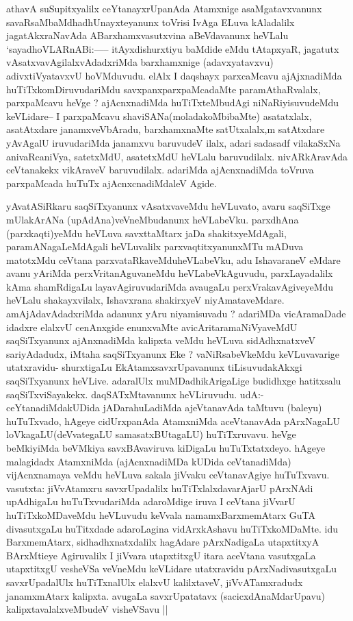 \begin{artha}
athavA suSupitxyalilx ceYtanayxrUpanAda Atamxnige asaMgatavxvanunx
savaRsaMbaMdhadhUnayxteyanunx toVrisi IvAga ELuva kAladalilx
jagatAkxraNavAda ABarxhamxvasutxvina aBeVdavanunx heVLalu
`sayadhoVLARnABi:----- itAyxdishurxtiyu baMdide eMdu tAtapxyaR,
jagatutx vAsatxvavAgilalxvAdadxriMda barxhamxnige (adavxyatavxvu)
adivxtiVyatavxvU hoVMduvudu. elAlx I daqshayx parxcaMcavu ajAjxnadiMda
huTiTxkomDiruvudariMdu savxpanxparxpaMcadaMte paramAthaRvalalx,
parxpaMcavu heVge ? ajAcnxnadiMda huTiTxteMbudAgi niNaRiyisuvudeMdu
keVLidare-- I parxpaMcavu shaviSANa(moladakoMbibaMte) asatatxlalx,
asatAtxdare janamxveVbAradu, barxhamxnaMte satUtxalalx,m satAtxdare
yAvAgalU iruvudariMda janamxvu baruvudeV ilalx, adari sadasadf
vilakaSxNa anivaRcaniVya, satetxMdU, asatetxMdU heVLalu
baruvudilalx. nivARkAravAda ceVtanakekx vikAraveV
baruvudilalx. adariMda ajAcnxnadiMda toVruva parxpaMcada huTuTx
ajAcnxcnadiMdaleV Agide.
\end{artha}

\begin{artha}
yAvatASiRkaru saqSiTxyanunx vAsatxvaveMdu heVLuvato, avaru saqSiTxge
mUlakArANa (upAdAna)veVneMbudanunx heVLabeVku. parxdhAna
(parxkaqti)yeMdu heVLuva savxttaMtarx jaDa shakitxyeMdAgali,
paramANagaLeMdAgali heVLuvalilx parxvaqtitxyanunxMTu mADuva matotxMdu
ceVtana parxvataRkaveMduheVLabeVku, adu IshavaraneV eMdare avanu
yAriMda perxVritanAguvaneMdu heVLabeVkAguvudu, parxLayadalilx kAma
shamRdigaLu layavAgiruvudariMda avaugaLu perxVrakavAgiveyeMdu heVLalu
shakayxvilalx, Ishavxrana shakirxyeV
niyAmataveMdare. amAjAdavAdadxriMda adanunx yAru niyamisuvadu ?
adariMDa vicAramaDade idadxre elalxvU cenAnxgide enunxvaMte
avicAritaramaNiVyaveMdU saqSiTxyanunx ajAnxnadiMda kalipxta veMdu
heVLuva sidAdhxnatxveV sariyAdadudx, iMtaha saqSiTxyanunx Eke ?
vaNiRsabeVkeMdu keVLuvavarige utatxravidu- shurxtigaLu
EkAtamxsavxrUpavanunx tiLisuvudakAkxgi saqSiTxyanunx
heVLive. adaralUlx muMDadhikArigaLige budidhxge hatitxsalu
saqSiTxviSayakekx. daqSATxMtavanunx heVLiruvudu. udA:-
ceYtanadiMdakUDida jADarahuLadiMda ajeVtanavAda taMtuvu (baleyu)
huTuTxvado, hAgeye cidUrxpanAda AtamxniMda aceVtanavAda pArxNagaLU
loVkagaLU(deVvategaLU samasatxBUtagaLU) huTiTxruvavu. heVge beMkiyiMda
beVMkiya savxBAvaviruva kiDigaLu huTuTxtatxdeyo. hAgeye malagidadx
AtamxniMda (ajAcnxnadiMDa kUDida ceVtanadiMda) vijAcnxnamaya veMdu
heVLuva sakala jiVvaku ceVtanavAgiye huTuTxvavu. vasutxta: jiVvAtamxru
savxrUpadalilx huTiTxlalxdavarAjarU pArxNAdi upAdhigaLu
huTuTxvudariMda adaroMdige iruva I ceVtana jiVvarU huTiTxkoMDaveMdu
heVLuvudu keVvala namamxBarxmemAtarx GuTA divasutxgaLu huTitxdade
adaroLagina vidArxkAshavu huTiTxkoMDaMte. idu BarxmemAtarx,
sidhadhxnatxdalilx hagAdare pArxNadigaLa utapxtitxyA BArxMtieye
Agiruvalilx I jiVvara utapxtitxgU itara aceVtana vasutxgaLa
utapxtitxgU vesheVSa veVneMdu keVLidare utatxravidu pArxNadivasutxgaLu
savxrUpadalUlx huTiTxnalUlx elalxvU kalilxtaveV, jiVvATamxradudx
janamxmAtarx kalipxta. avugaLa savxrUpatatavx (sacicxdAnaMdarUpavu)
kalipxtavalalxveMbudeV visheVSavu ||
\end{artha}


